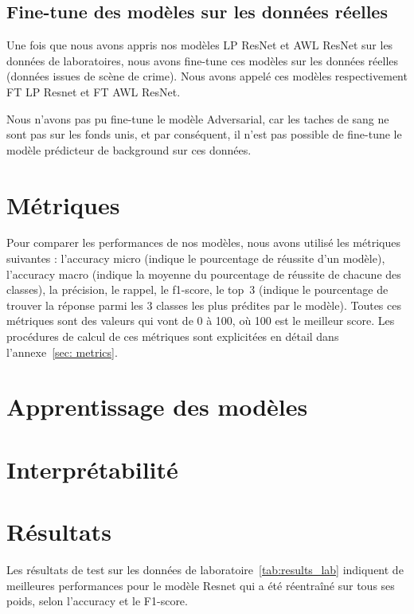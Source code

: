 \documentclass[a4paper]{article}
\begin{document}
\subsection{Fine-tune des modèles sur les données réelles}
Une fois que nous avons appris nos modèles LP ResNet et AWL ResNet sur les données de laboratoires, nous avons fine-tune ces modèles sur les données réelles (données issues de scène de crime). Nous avons appelé ces modèles respectivement FT LP Resnet et FT AWL ResNet.

Nous n'avons pas pu fine-tune le modèle Adversarial, car les taches de sang ne sont pas sur les fonds unis, et par conséquent, il n'est pas possible de fine-tune le modèle prédicteur de background sur ces données.

\section{Métriques}
Pour comparer les performances de nos modèles, nous avons utilisé les métriques suivantes : l'accuracy micro (indique le pourcentage de réussite d'un modèle), l'accuracy macro (indique la moyenne du pourcentage de réussite de chacune des classes), la précision, le rappel, le f1-score, le top~3 (indique le pourcentage de trouver la réponse parmi les 3 classes les plus prédites par le modèle). Toutes ces métriques sont des valeurs qui vont de 0 à 100, où 100 est le meilleur score. 
Les procédures de calcul de ces métriques sont explicitées en détail dans l'annexe~\ref{sec: metrics}.

\section{Apprentissage des modèles}


\section{Interprétabilité}


\section{Résultats}

Les résultats de test sur les données de laboratoire~\ref{tab:results_lab} indiquent de meilleures performances pour le modèle Resnet qui a été réentraîné sur tous ses poids, selon l'accuracy et le F1-score. 
\end{document}
